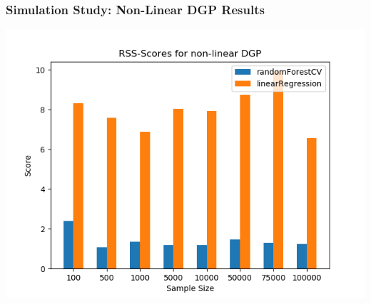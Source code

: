 \begin{frame}
	\frametitle{Simulation Study: Non-Linear DGP Results}
	\begin{center}		
		\includegraphics[height=0.7\textheight]{images/forest_vs_ols_nonlinearDGP.png}
	\end{center}
\end{frame}